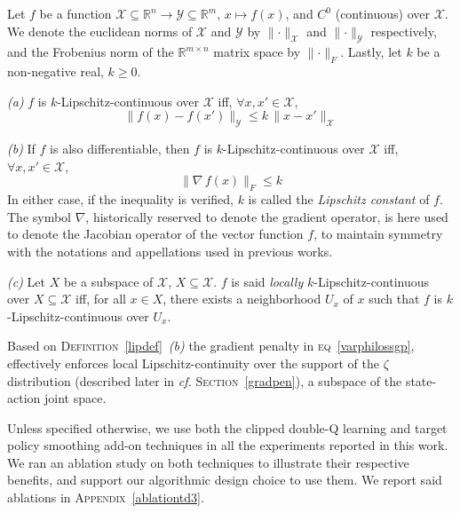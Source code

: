 \begin{definition}
\label{lipdef}
Let $f$ be a function
$\mathcal{X} \subseteq \mathbb{R}^{n} \rightarrow \mathcal{Y} \subseteq \mathbb{R}^{m}$,
$x \mapsto f(x)$,
and $C^0$ (continuous) over $\mathcal{X}$.
We denote the euclidean norms of $\mathcal{X}$ and $\mathcal{Y}$ by
$\lVert \cdot \rVert_\mathcal{X}$ and $\lVert \cdot \rVert_\mathcal{Y}$ respectively,
and the Frobenius norm of the $\mathbb{R}^{m \times n}$ matrix space by $\lVert \cdot \rVert_F$.
Lastly, let $k$ be a non-negative real, $k \geq 0$.

\textit{(a)} $f$ is $k$-Lipschitz-continuous over $\mathcal{X}$ iff,
$\forall x, x' \in \mathcal{X}$,
\[\lVert f(x) - f(x') \rVert_\mathcal{Y} \leq k \, \lVert x - x' \rVert_\mathcal{X}\]

\textit{(b)} If $f$ is also differentiable,
then $f$ is $k$-Lipschitz-continuous over $\mathcal{X}$ iff,
$\forall x, x' \in \mathcal{X}$,
\[\lVert  \nabla \, f(x) \rVert_F \leq k\]
In either case, if the inequality is verified, $k$ is called the \textit{Lipschitz constant} of $f$.
The symbol $\nabla$, historically reserved to denote the gradient operator,
is here used to denote the Jacobian operator of the vector function $f$, to maintain symmetry with
the notations and appellations used in previous works.

\textit{(c)} Let $X$ be a subspace of $\mathcal{X}$, $X \subseteq \mathcal{X}$.
$f$ is said \emph{locally} $k$-Lipschitz-continuous over
$X \subseteq \mathcal{X}$ iff, for all $x \in X$,
there exists a neighborhood $U_x$ of $x$
such that $f$ is $k$-Lipschitz-continuous over $U_x$.
\end{definition}

Based on \textsc{Definition}~\ref{lipdef}~\textit{(b)}
the gradient penalty in \textsc{eq}~\ref{varphilossgp},
effectively enforces local Lipschitz-continuity over the support of the
$\zeta$ distribution (described later in \textit{cf.} \textsc{Section}~\ref{gradpen}),
a subspace of the state-action joint space.

Unless specified otherwise, we use both the clipped double-Q learning and target policy smoothing
add-on techniques in all the experiments reported in this work.
We ran an ablation study on both techniques to illustrate their respective benefits,
and support our algorithmic design choice to use them.
We report said ablations in \textsc{Appendix}~\ref{ablationtd3}.

